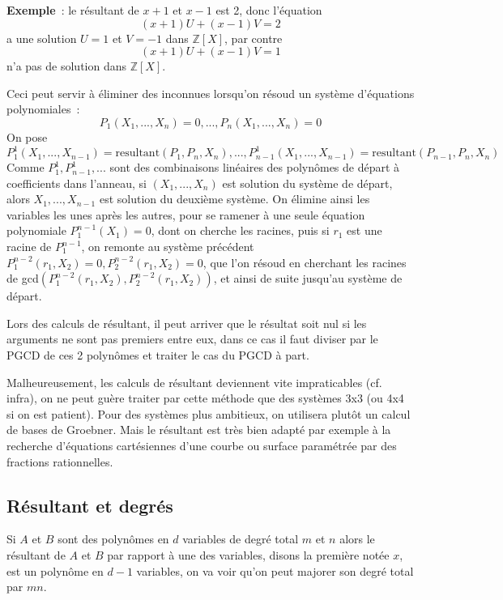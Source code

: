 \documentclass[a4paper,11pt]{article}
\newcommand{\Z}{{\mathbb{Z}}}
\begin{document}
{\bf Exemple}~: le r\'esultant de $x+1$ et $x-1$ est 2, donc l'\'equation
$$ (x+1)U+(x-1)V=2$$ a une solution $U=1$ et $V=-1$ dans $\Z[X]$,
par contre $$ (x+1)U+(x-1)V=1$$ n'a pas de solution dans $\Z[X]$.

Ceci peut servir \`a \'eliminer des inconnues lorsqu'on r\'esoud un
syst\`eme d'\'equations polynomiales~:
$$ P_1(X_1,...,X_n)=0, ..., P_n(X_1,...,X_n)=0$$
On pose 
$$P^1_1(X_1,...,X_{n-1})=\mbox{resultant}(P_1,P_n,X_n), ..., 
P^1_{n-1}(X_1,...,X_{n-1})=\mbox{resultant}(P_{n-1},P_n,X_n)
$$
Comme $P^1_1, P^1_{n-1}, ...$ sont des combinaisons lin\'eaires des
polyn\^omes de d\'epart \`a coefficients dans l'anneau, si
$(X_1,...,X_n)$
est solution du syst\`eme de d\'epart, alors $X_1,...,X_{n-1}$
est solution du deuxi\`eme syst\`eme.
On \'elimine ainsi les variables les unes apr\`es les autres,
pour se ramener \`a une seule \'equation polynomiale $P^{n-1}_1(X_1)=0$, dont on
cherche les racines, puis si $r_1$ est une racine de $P^{n-1}_1$, on
remonte au syst\`eme pr\'ec\'edent $P^{n-2}_1(r_1,X_2)=0,
P^{n-2}_2(r_1,X_2)=0$, que l'on r\'esoud en cherchant
les racines de gcd$(P^{n-2}_1(r_1,X_2),P^{n-2}_2(r_1,X_2))$, et ainsi
de suite jusqu'au syst\`eme de d\'epart.

Lors des calculs de r\'esultant, il peut arriver que le r\'esultat
soit nul si les arguments ne sont pas premiers entre eux, dans
ce cas il faut diviser par le PGCD de ces 2 polyn\^omes et traiter le cas
du PGCD \`a part.

Malheureusement, les calculs de r\'esultant deviennent vite
impraticables (cf. infra), on ne peut gu\`ere traiter par cette m\'ethode
que des syst\`emes 3x3 (ou 4x4 si on est patient). Pour
des syst\`emes plus ambitieux, on utilisera plut\^ot un
calcul de bases de Groebner. Mais le r\'esultant est tr\`es bien
adapt\'e par exemple \`a la recherche d'\'equations cart\'esiennes
d'une courbe ou surface param\'etr\'ee par des fractions rationnelles.

\subsection{R\'esultant et degr\'es}
Si $A$ et $B$ sont des polyn\^omes en $d$ variables de degr\'e
total $m$ et $n$ alors le r\'esultant de $A$ et $B$ par rapport \`a
une des variables, disons la premi\`ere not\'ee $x$,
 est un polyn\^ome en $d-1$ variables, on va voir qu'on peut
majorer son degr\'e total par $mn$.
\end{document}

